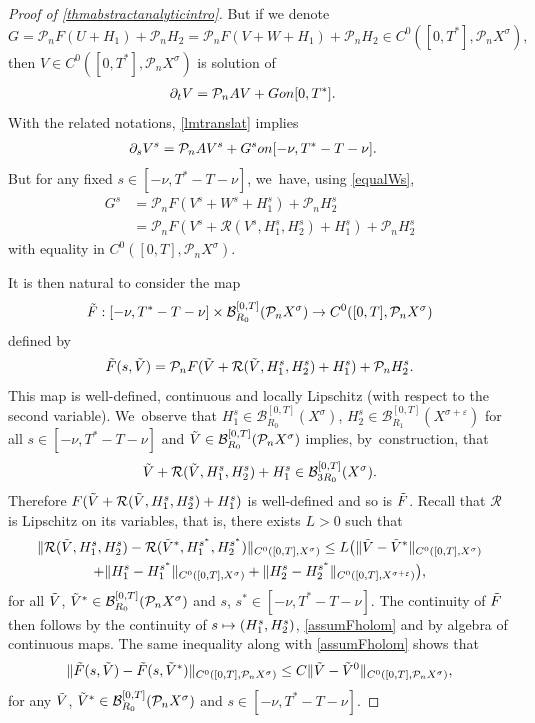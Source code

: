 \documentclass[11pt]{article}
\newcommand\mto{\mathchoice{\longmapsto}{\mapsto}{\mapsto}{\mapsto}}
\theoremstyle{definition}
\let\mc\mathcal
\let\veps\varepsilon
\newcommand{\B}{\mc{B}}
\renewcommand{\P}{\mathcal{P}}
\providecommand{\norm}[1]{\lVert#1\rVert}
\begin{document}
\begin{proof}[Proof of \cref{thmabstractanalyticintro}]
But if we denote
\[
G=\P_n F(U+H_{1})+\P_n H_{2}=\P_n F(V+W+H_{1})+\P_n H_{2}\in C^0([0,T^*],\P_n X^{\sigma}),
\]
then $V\in C^0([0,T^*],\P_n X^{\sigma})$ is solution of
\begin{align*}
\partial_t V=\P_n AV+G& \textnormal{ on } [0,T^{*}].
\end{align*}
With the related notations, \cref{lmtranslat} implies
\begin{align}
\label{eqVG}
\partial_s V^s=\P_n AV^s+G^s& \textnormal{ on } [-\nu, T^*-T-\nu].
\end{align}
But for any fixed $s\in [-\nu, T^*-T-\nu]$, we~have, using \eqref{equalWs},
\begin{align*}
G^s&=\P_n F(V^s+W^s+H_{1}^s)+\P_n H_{2}^s\\ &=\P_n F(V^s+\mathcal{R}(V^s,H_{1}^s,H_{2}^s)+H_{1}^s)+\P_n H_{2}^s
\end{align*}
with equality in $C^0([0,T], \P_n X^{\sigma})$.

It is then natural to consider the map
\begin{align*}
\Tilde{F}: [-\nu, T^*-T-\nu]\times \B_{R_{0}}^{[0,T]}(\P_n X^{\sigma})\to C^0([0, T], \P_n X^\sigma)
\end{align*}
defined by
\begin{align*}
\Tilde{F}(s,\Tilde{V})=\P_n F(\Tilde{V}+\mathcal{R}(\Tilde{V},H_{1}^s,H_{2}^s)+H_{1}^s)+\P_n H_{2}^s.
\end{align*}
This map is well-defined, continuous and locally Lipschitz (with respect to the second variable). We~observe that $H_1^s\in \B_{R_0}^{[0, T]}(X^\sigma)$, $H_2^s\in \B_{R_{1}}^{[0, T]}(X^{\sigma+\veps})$ for all \hbox{$s\in [-\nu, T^*-T-\nu]$} and $\Tilde{V}\in \B_{R_{0}}^{[0,T]}(\P_n X^{\sigma})$ implies, by~construction, that
\[
\Tilde{V}+\mathcal{R}(\Tilde{V},H_{1}^s,H_{2}^s)+H_{1}^s\in \B_{3R_0}^{[0, T]}(X^\sigma).
\]
Therefore $F(\Tilde{V}+\mathcal{R}(\Tilde{V},H_{1}^s,H_{2}^s)+H_{1}^s)$ is well-defined and so is $\Tilde{F}$. Recall that $\mc{R}$ is Lipschitz on its variables, that is, there exists $L>0$ such that
\begin{multline*}
\norm{\mc{R}(\Tilde{V}, H_{1}^{s}, H_2^{s})-\mc{R}(\Tilde{V}^*, H_{1}^{s^*}, H_2^{s^*})}_{C^0([0, T], X^\sigma)}\leq L\big( \norm{\Tilde{V}-\Tilde{V}^*}_{C^0([0, T], X^\sigma)}\\+\norm{H_1^{s}-H_1^{s^*}}_{C^0([0, T], X^\sigma)}+\norm{H_2^{s}-H_2^{s^*}}_{C^0([0, T], X^{\sigma+\veps})} \big),
\end{multline*}
for all $\Tilde{V}$, $\Tilde{V}^*\in \B_{R_{0}}^{[0,T]}(\P_n X^{\sigma})$ and $s$, $s^*\in [-\nu, T^*-T-\nu]$. The continuity of $\Tilde{F}$ then follows by the continuity of $s\mto (H_1^s, H_2^s)$, \cref{assumFholom} and by algebra of continuous maps. The same inequality along with \cref{assumFholom} shows that
\begin{align*}
\norm{\Tilde{F}(s, \Tilde{V})-\Tilde{F}(s, \Tilde{V}^*)}_{C^0([0, T], \P_n X^\sigma)}\leq C\norm{\Tilde{V}-\Tilde{V}^0}_{C^0([0, T], \P_n X^\sigma)},
\end{align*}
for any $\Tilde{V}$, $\Tilde{V}^*\in \B_{R_{0}}^{[0,T]}(\P_n X^{\sigma})$ and $s\in [-\nu, T^*-T-\nu]$.


\end{proof}
\end{document}
